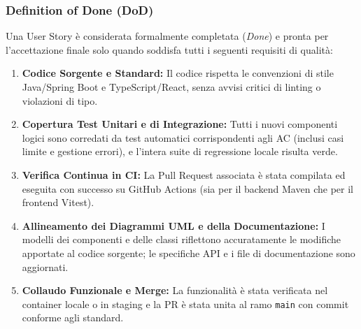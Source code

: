 \subsubsection{Definition of Done (DoD)}
Una User Story è considerata formalmente completata (\emph{Done}) e pronta per l'accettazione finale solo quando soddisfa tutti i seguenti requisiti di qualità:
\begin{enumerate}[leftmargin=1.4em, itemsep=0.2em]
    \item \textbf{Codice Sorgente e Standard:} Il codice rispetta le convenzioni di stile Java/Spring Boot e TypeScript/React, senza avvisi critici di linting o violazioni di tipo.
    \item \textbf{Copertura Test Unitari e di Integrazione:} Tutti i nuovi componenti logici sono corredati da test automatici corrispondenti agli AC (inclusi casi limite e gestione errori), e l'intera suite di regressione locale risulta verde.
    \item \textbf{Verifica Continua in CI:} La Pull Request associata è stata compilata ed eseguita con successo su GitHub Actions (sia per il backend Maven che per il frontend Vitest).
    \item \textbf{Allineamento dei Diagrammi UML e della Documentazione:} I modelli dei componenti e delle classi riflettono accuratamente le modifiche apportate al codice sorgente; le specifiche API e i file di documentazione sono aggiornati.
    \item \textbf{Collaudo Funzionale e Merge:} La funzionalità è stata verificata nel container locale o in staging e la PR è stata unita al ramo \texttt{main} con commit conforme agli standard.
\end{enumerate}
